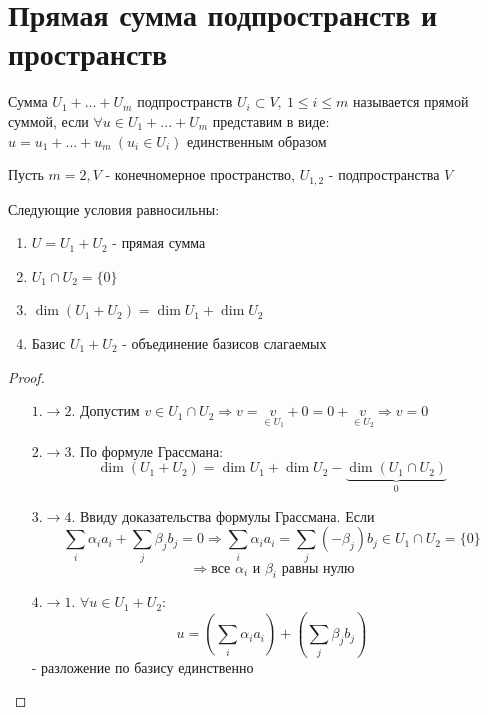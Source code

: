 \section{Прямая сумма подпространств и пространств}
    \begin{definition}
        Сумма $U_1+...+U_m$ подпространств $U_i \subset V, \ 1\leq i \leq m$ называется прямой суммой, если 
        $\forall u \in U_1+...+U_m$  представим в виде: \\$u = u_1+...+u_m \ (u_i \in U_i)$  единственным образом    
    \end{definition} 
    Пусть $m=2, V$ - конечномерное пространство, $U_{1,2}$ - подпространства $V$
    \begin{theorem}
        Следующие условия равносильны: 
        \begin{enumerate}
            \item $U = U_1 + U_2$ - прямая сумма
            \item $U_1 \cap U_2 = \{0\}$
            \item $\dim (U_1 + U_2) = \dim U_1 + \dim U_2$
            \item Базис $U_1 + U_2$ - объединение базисов слагаемых    
        \end{enumerate} 
    \end{theorem} 
    \begin{proof}\tab
        \begin{itemize}
            \item[$1. \to 2.$] Допустим $v \in U_1 \cap U_2 \Longrightarrow v = \underset{\in U_1}{v} + 0 = 0 + \underset{\in U_2}{v}  \Longrightarrow v = 0$
            \item[$2. \to 3.$] По формуле Грассмана: 
            $$\dim (U_1 + U_2) = \dim U_1 + \dim U_2 - \underbrace{\dim (U_1 \cap U_2)}_{0}$$
            \item[$3. \to 4.$] Ввиду доказательства формулы Грассмана. Если $$\sum \limits_{i} \alpha_i a_i + \sum \limits_{j} \beta_j b_j = 0 \Longrightarrow \sum \limits_{i} \alpha_i a_i = \sum \limits_{j} (-\beta_j) b_j \in U_1 \cap U_2 = \{0\}$$
            $$\Longrightarrow  \text{все } \alpha_i \text{ и } \beta_i \text{ равны нулю}$$
            \item[$4. \to 1.$] $\forall u \in U_1 + U_2: $ $$
            u = (\sum \limits_{i} \alpha_i a_i) + (\sum \limits_{j} \beta_j b_j)$$ 
            - разложение по базису единственно  
        \end{itemize}
    \end{proof}
